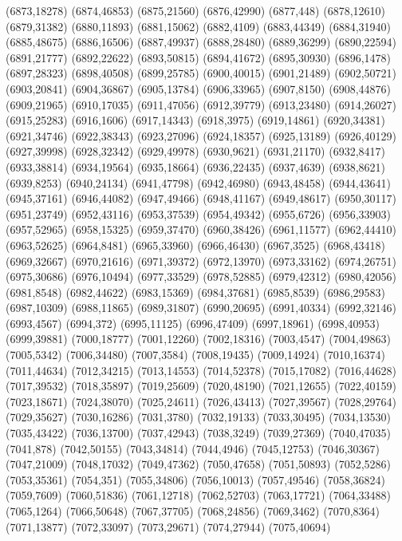 (6873,18278)
(6874,46853)
(6875,21560)
(6876,42990)
(6877,448)
(6878,12610)
(6879,31382)
(6880,11893)
(6881,15062)
(6882,4109)
(6883,44349)
(6884,31940)
(6885,48675)
(6886,16506)
(6887,49937)
(6888,28480)
(6889,36299)
(6890,22594)
(6891,21777)
(6892,22622)
(6893,50815)
(6894,41672)
(6895,30930)
(6896,1478)
(6897,28323)
(6898,40508)
(6899,25785)
(6900,40015)
(6901,21489)
(6902,50721)
(6903,20841)
(6904,36867)
(6905,13784)
(6906,33965)
(6907,8150)
(6908,44876)
(6909,21965)
(6910,17035)
(6911,47056)
(6912,39779)
(6913,23480)
(6914,26027)
(6915,25283)
(6916,1606)
(6917,14343)
(6918,3975)
(6919,14861)
(6920,34381)
(6921,34746)
(6922,38343)
(6923,27096)
(6924,18357)
(6925,13189)
(6926,40129)
(6927,39998)
(6928,32342)
(6929,49978)
(6930,9621)
(6931,21170)
(6932,8417)
(6933,38814)
(6934,19564)
(6935,18664)
(6936,22435)
(6937,4639)
(6938,8621)
(6939,8253)
(6940,24134)
(6941,47798)
(6942,46980)
(6943,48458)
(6944,43641)
(6945,37161)
(6946,44082)
(6947,49466)
(6948,41167)
(6949,48617)
(6950,30117)
(6951,23749)
(6952,43116)
(6953,37539)
(6954,49342)
(6955,6726)
(6956,33903)
(6957,52965)
(6958,15325)
(6959,37470)
(6960,38426)
(6961,11577)
(6962,44410)
(6963,52625)
(6964,8481)
(6965,33960)
(6966,46430)
(6967,3525)
(6968,43418)
(6969,32667)
(6970,21616)
(6971,39372)
(6972,13970)
(6973,33162)
(6974,26751)
(6975,30686)
(6976,10494)
(6977,33529)
(6978,52885)
(6979,42312)
(6980,42056)
(6981,8548)
(6982,44622)
(6983,15369)
(6984,37681)
(6985,8539)
(6986,29583)
(6987,10309)
(6988,11865)
(6989,31807)
(6990,20695)
(6991,40334)
(6992,32146)
(6993,4567)
(6994,372)
(6995,11125)
(6996,47409)
(6997,18961)
(6998,40953)
(6999,39881)
(7000,18777)
(7001,12260)
(7002,18316)
(7003,4547)
(7004,49863)
(7005,5342)
(7006,34480)
(7007,3584)
(7008,19435)
(7009,14924)
(7010,16374)
(7011,44634)
(7012,34215)
(7013,14553)
(7014,52378)
(7015,17082)
(7016,44628)
(7017,39532)
(7018,35897)
(7019,25609)
(7020,48190)
(7021,12655)
(7022,40159)
(7023,18671)
(7024,38070)
(7025,24611)
(7026,43413)
(7027,39567)
(7028,29764)
(7029,35627)
(7030,16286)
(7031,3780)
(7032,19133)
(7033,30495)
(7034,13530)
(7035,43422)
(7036,13700)
(7037,42943)
(7038,3249)
(7039,27369)
(7040,47035)
(7041,878)
(7042,50155)
(7043,34814)
(7044,4946)
(7045,12753)
(7046,30367)
(7047,21009)
(7048,17032)
(7049,47362)
(7050,47658)
(7051,50893)
(7052,5286)
(7053,35361)
(7054,351)
(7055,34806)
(7056,10013)
(7057,49546)
(7058,36824)
(7059,7609)
(7060,51836)
(7061,12718)
(7062,52703)
(7063,17721)
(7064,33488)
(7065,1264)
(7066,50648)
(7067,37705)
(7068,24856)
(7069,3462)
(7070,8364)
(7071,13877)
(7072,33097)
(7073,29671)
(7074,27944)
(7075,40694)
